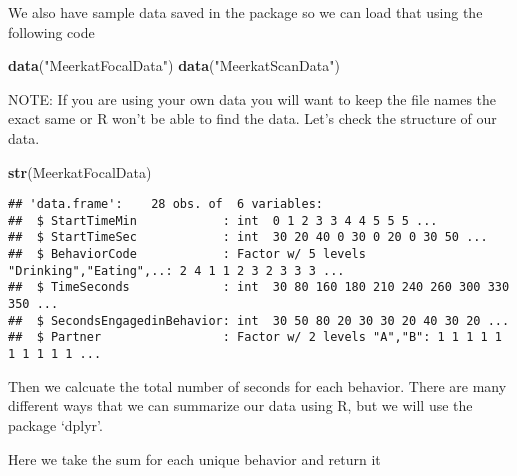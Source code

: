\documentclass[]{book}
\newenvironment{Shaded}{\begin{snugshade}}{\end{snugshade}}
\newcommand{\DataTypeTok}[1]{\textcolor[rgb]{0.13,0.29,0.53}{#1}}
\newcommand{\KeywordTok}[1]{\textcolor[rgb]{0.13,0.29,0.53}{\textbf{#1}}}
\newcommand{\NormalTok}[1]{#1}
\newcommand{\OperatorTok}[1]{\textcolor[rgb]{0.81,0.36,0.00}{\textbf{#1}}}
\newcommand{\StringTok}[1]{\textcolor[rgb]{0.31,0.60,0.02}{#1}}
\begin{document}
We also have sample data saved in the package so we can load that using the following code

\begin{Shaded}
\begin{Highlighting}[]
\KeywordTok{data}\NormalTok{(}\StringTok{"MeerkatFocalData"}\NormalTok{)}
\KeywordTok{data}\NormalTok{(}\StringTok{"MeerkatScanData"}\NormalTok{)}
\end{Highlighting}
\end{Shaded}

NOTE: If you are using your own data you will want to keep the file names the exact same or R won't be able to find the data.
Let's check the structure of our data.

\begin{Shaded}
\begin{Highlighting}[]
\KeywordTok{str}\NormalTok{(MeerkatFocalData)}
\end{Highlighting}
\end{Shaded}

\begin{verbatim}
## 'data.frame':    28 obs. of  6 variables:
##  $ StartTimeMin            : int  0 1 2 3 3 4 4 5 5 5 ...
##  $ StartTimeSec            : int  30 20 40 0 30 0 20 0 30 50 ...
##  $ BehaviorCode            : Factor w/ 5 levels "Drinking","Eating",..: 2 4 1 1 2 3 2 3 3 3 ...
##  $ TimeSeconds             : int  30 80 160 180 210 240 260 300 330 350 ...
##  $ SecondsEngagedinBehavior: int  30 50 80 20 30 30 20 40 30 20 ...
##  $ Partner                 : Factor w/ 2 levels "A","B": 1 1 1 1 1 1 1 1 1 1 ...
\end{verbatim}

Then we calcuate the total number of seconds for each behavior. There are many different ways that we can summarize our data using R, but we will use the package `dplyr'.

Here we take the sum for each unique behavior and return it

\begin{Shaded}
\end{Shaded}
\end{document}
